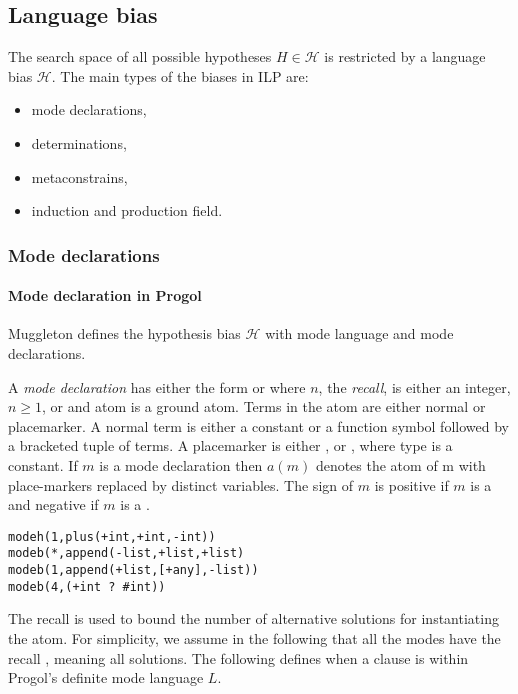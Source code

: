 \subsection{Language bias}\label{subsec:background_language_bias}
The search space of all possible hypotheses $H \in \mathcal{H}$ is restricted by a language bias $\mathcal{H}$. The main types of the biases in ILP are:
\begin{itemize}
\item mode declarations,
\item determinations,
\item metaconstrains,
\item induction and production field.
\end{itemize}

\subsubsection{Mode declarations}\label{background_mode_declarations}
\paragraph{Mode declaration in Progol}
Muggleton defines the hypothesis bias $\mathcal{H}$ with mode language and mode declarations.
\begin{defn}\cite{muggleton1995inverse}
A \emph{mode declaration} has either the form
 or  where $n$, the \emph{recall}, is either an integer, $n \ge 1$,
or \tc{*} and atom is a ground atom. Terms in the atom are either normal or placemarker. A normal term is either a constant or a function symbol followed by a
bracketed tuple of terms. A placemarker is either ,  or , where
type is a constant. If $m$ is a mode declaration then $a(m)$ denotes the atom of m
with place-markers replaced by distinct variables. The sign of $m$ is positive if $m$
is a  and negative if $m$ is a .
\end{defn}

\begin{exmp}\cite{muggleton1995inverse}
\begin{lstlisting}
modeh(1,plus(+int,+int,-int))
modeb(*,append(-list,+list,+list)
modeb(1,append(+list,[+any],-list))
modeb(4,(+int ? #int))
\end{lstlisting}
\end{exmp}

\begin{remark}\cite{muggleton1995inverse}
The recall is used to bound the number of alternative solutions for instantiating
the atom. For simplicity, we assume in the following that all the modes have the
recall \tc{*}, meaning all solutions. The following defines when a clause is within Progol's definite mode language $L$.
\end{remark}

